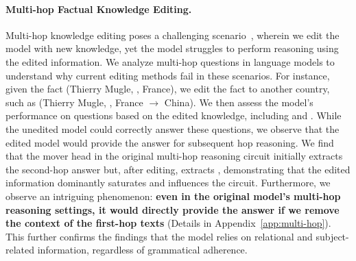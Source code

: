 \paragraph{Multi-hop Factual Knowledge Editing.}
Multi-hop knowledge editing poses a challenging scenario~\cite{yao-etal-2023-editing,10.1162/tacl_a_00644,zhong-etal-2023-mquake}, wherein we edit the model with new knowledge, yet the model struggles to perform reasoning using the edited information.
We analyze multi-hop questions in language models \cite{yang2024large,ju2024investigating} to understand why current editing methods fail in these scenarios.
For instance, given the fact (Thierry Mugle, , France), we edit the fact to another country, such as (Thierry Mugle, , France $\rightarrow$ China).
We then assess the model's performance on questions based on the edited knowledge, including  and .
While the unedited model could correctly answer these questions, we observe that the edited model would provide the answer  for subsequent hop reasoning.
We find that the mover head in the original multi-hop reasoning circuit initially extracts the second-hop answer but, after editing, extracts , demonstrating that the edited information dominantly saturates and influences the circuit.
Furthermore, we observe an intriguing phenomenon: \textbf{even in the original model's multi-hop reasoning settings, it would directly provide the answer if we remove the context of the first-hop texts} (Details in Appendix~\ref{app:multi-hop}).
This further confirms the findings that the model relies on relational and subject-related information, regardless of grammatical adherence.
%     
